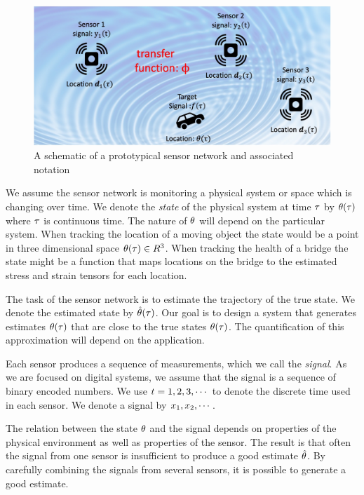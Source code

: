 \documentclass{article}
\newcommand{\comment}[3]{{\color{#1} {\bf #2 :} #3}}
\newcommand{\yoav}[1]{\comment{magenta}{Yoav}{#1}}
\begin{document}
\begin{figure}[t]
\centering
\includegraphics[width=0.9\columnwidth]{figs/Framework.jpg}
\caption{A schematic of a prototypical sensor network and associated
  notation\label{fig:prototypicalSensorNetwork}}
\end{figure}

We assume the sensor network is monitoring a physical system or space which is changing over time. We denote the {\em state} of the physical system at time $\tau$ by $\theta(\tau)$ where $\tau$ is continuous time. The nature of $\theta$ will depend on the particular system. When tracking the location of a moving object the state would be a point in three dimensional space $\theta(\tau) \in R^3$. When tracking the health of a bridge the state might be a function that maps locations on the bridge to the estimated stress and strain tensors for each location.

The task of the sensor network is to estimate the trajectory of the true state. We denote the estimated state by $\hat{\theta}(\tau)$. Our goal is to design a system that generates estimates $\theta(\tau)$ that are close to the true states $\theta(\tau)$. The quantification of this approximation will depend on the application.

Each sensor produces a sequence of measurements, which we call the {\em signal}. As we are focused on digital systems, we assume that the signal is a sequence of binary encoded numbers. We use $t =1,2,3,\cdots$ to denote the discrete time used in each sensor. We denote a signal by $x_1,x_2,\cdots$.


The relation between the state $\theta$ and the signal depends on properties of the physical environment as well as properties of the sensor. The result is that often the signal from one sensor is insufficient to produce a good estimate $\hat{\theta}$. By carefully combining the signals from several sensors, it is possible to generate a good estimate.
\end{document}
